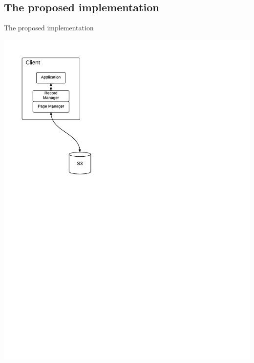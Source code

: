 \documentclass{beamer}
\begin{document}
\subsection{The proposed implementation}
  \begin{frame}{The proposed implementation}
    \begin{center}
      \includegraphics[width=\linewidth]{img/ADB arch 1.pdf}
    \end{center}
  \end{frame}
\end{document}
